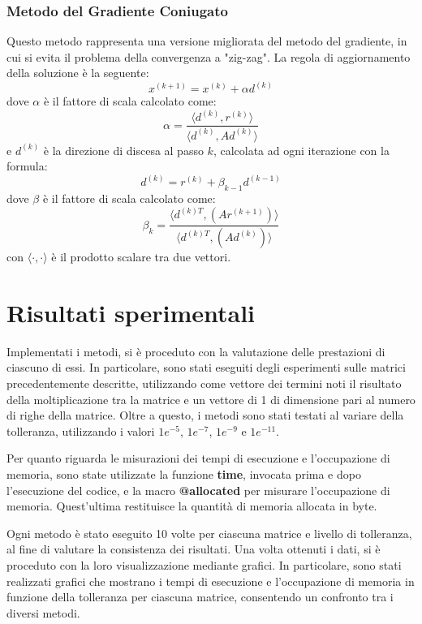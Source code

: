 \subsubsection{Metodo del Gradiente Coniugato}
Questo metodo rappresenta una versione migliorata del metodo del gradiente, in
cui si evita il problema della convergenza a "zig-zag". La regola di aggiornamento
della soluzione è la seguente:
\begin{equation}
    x^{(k+1)} = x^{(k)} + \alpha d^{(k)}
\end{equation}
dove $\alpha$ è il fattore di scala calcolato come:
\begin{equation}
    \alpha = \frac{\langle d^{(k)}, r^{(k)}\rangle}{\langle d^{(k)}, Ad^{(k)}\rangle}
\end{equation}
e $d^{(k)}$ è la direzione di discesa al passo $k$, calcolata ad ogni iterazione
con la formula:
\begin{equation}
    d^{(k)} = r^{(k)} + \beta_{k-1} d^{(k-1)}
\end{equation}
dove $\beta$ è il fattore di scala calcolato come:
\begin{equation}
    \beta_k = \frac{\langle d^{(k)T}, (Ar^{(k + 1)})\rangle}{\langle d^{(k)T}, (Ad^{(k)})\rangle}
\end{equation}
con $\langle \cdot, \cdot \rangle$ è il prodotto scalare tra due vettori.

\section{Risultati sperimentali}
Implementati i metodi, si è proceduto con la valutazione delle prestazioni di
ciascuno di essi. In particolare, sono stati eseguiti degli esperimenti sulle
matrici precedentemente descritte, utilizzando come vettore dei termini noti il
risultato della moltiplicazione tra la matrice e un vettore di 1 di dimensione
pari al numero di righe della matrice. Oltre a questo, i metodi sono stati testati
al variare della tolleranza, utilizzando i valori $1e^{-5}$, $1e^{-7}$, $1e^{-9}$
e $1e^{-11}$.

Per quanto riguarda le misurazioni dei tempi di esecuzione e l'occupazione di
memoria, sono state utilizzate la funzione \textbf{time}, invocata prima e dopo
l'esecuzione del codice, e la macro \textbf{@allocated} per misurare l'occupazione
di memoria. Quest'ultima restituisce la quantità di memoria allocata in byte.

Ogni metodo è stato eseguito 10 volte per ciascuna matrice e livello di tolleranza,
al fine di valutare la consistenza dei risultati. Una volta ottenuti i dati, si è
proceduto con la loro visualizzazione mediante grafici. In particolare, sono stati
realizzati grafici che mostrano i tempi di esecuzione e l'occupazione di memoria
in funzione della tolleranza per ciascuna matrice, consentendo un confronto tra
i diversi metodi.

